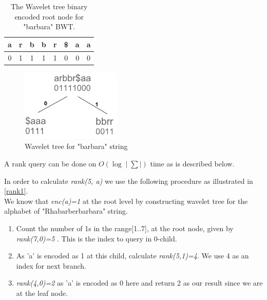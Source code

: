 \documentclass[11pt,a4paper]{report}
\begin{document}
\begin{table}[h]
\centering
  \begin{tabular}{ c c c c c c c c}
   a  & r & b & b & r & \$ & a & a \\ 
  \hline
   0 &	1 &	1 & 1 & 1 & 0 & 0 & 0\\  
  \hline
  \end{tabular}
\caption{The Wavelet tree binary encoded root node for "barbara" BWT.}
\label{wavlet-binary-barbara}
\end{table}


\begin{figure}[H]
\centering
\includegraphics[width=4.75cm]{pictures/WavletBarbara.png}
\caption{Wavelet tree for "barbara" string }
\label{Wavlet-barbara}
\end{figure}


A rank query can be done on  $O(\log{}\mid\sum\mid)$ time as is described below.

In order to calculate \emph{rank(5, a)} we use the following procedure
as illustrated in \ref{rank1}.\\
We know that \emph{enc(a)=1} at the root level by constructing wavelet
tree for the alphabet of  "Rhabarberbarbara" string.

\begin{enumerate}

    \item
		 Count the number of 1s in the range[1..7], at the root node, 
		 given by \emph{rank(7,0)=5 }. This is the index to query in 0-child.
		 
    \item
		As 'a' is encoded as 1 at this child, calculate \emph{rank(5,1)=4}. 
		We use 4 as an index for next branch.

    \item
		\emph{rank(4,0)=2} as 'a' is encoded as 0 here and return 2 as our
		 result since we are at the leaf node.

\end{enumerate}
\end{document}
